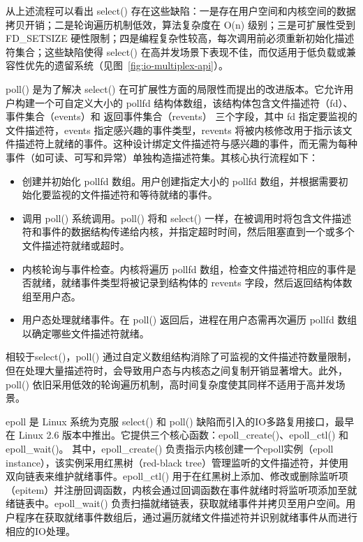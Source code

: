 {\begin{enumerate}[label=\arabic*.]
    从上述流程可以看出 select() 存在这些缺陷：一是存在用户空间和内核空间的数据拷贝开销；二是轮询遍历机制低效，算法复杂度在 O(n) 级别；三是可扩展性受到 FD\_SETSIZE 硬性限制；四是编程复杂性较高，每次调用前必须重新初始化描述符集合；这些缺陷使得 select() 在高并发场景下表现不佳，而仅适用于低负载或兼容性优先的遗留系统（见图~\ref{fig:io-multiplex-api}）。

    poll() 是为了解决 select() 在可扩展性方面的局限性而提出的改进版本。它允许用户构建一个可自定义大小的 pollfd 结构体数组，该结构体包含文件描述符（fd）、事件集合（events）和 返回事件集合（revents） 三个字段，其中 fd 指定要监视的文件描述符，events 指定感兴趣的事件类型，revents 将被内核修改用于指示该文件描述符上就绪的事件。这种设计绑定文件描述符与感兴趣的事件，而无需为每种事件（如可读、可写和异常）单独构造描述符集。其核心执行流程如下：
    \begin{itemize}
        \item 创建并初始化 pollfd 数组。用户创建指定大小的 pollfd 数组，并根据需要初始化要监视的文件描述符和等待就绪的事件。
        \item 调用 poll() 系统调用。poll() 将和 select() 一样，在被调用时将包含文件描述符和事件的数据结构传递给内核，并指定超时时间，然后阻塞直到一个或多个文件描述符就绪或超时。
        \item 内核轮询与事件检查。内核将遍历 pollfd 数组，检查文件描述符相应的事件是否就绪，就绪事件类型将被记录到结构体的 revents 字段，然后返回结构体数组至用户态。
        \item 用户态处理就绪事件。在 poll() 返回后，进程在用户态需再次遍历 pollfd 数组以确定哪些文件描述符就绪。
    \end{itemize}
    
    相较于select()，poll() 通过自定义数组结构消除了可监视的文件描述符数量限制，但在处理大量描述符时，会导致用户态与内核态之间复制开销显著增大。此外，poll() 依旧采用低效的轮询遍历机制，高时间复杂度使其同样不适用于高并发场景。
    
    epoll 是 Linux 系统为克服 select() 和 poll() 缺陷而引入的IO多路复用接口，最早在 Linux 2.6 版本中推出。它提供三个核心函数：epoll\_create()、epoll\_ctl() 和 epoll\_wait()。 其中，epoll\_create() 负责指示内核创建一个epoll实例（epoll instance），该实例采用红黑树（red-black tree）管理监听的文件描述符，并使用双向链表来维护就绪事件。epoll\_ctl() 用于在红黑树上添加、修改或删除监听项（epitem）并注册回调函数，内核会通过回调函数在事件就绪时将监听项添加至就绪链表中。epoll\_wait() 负责扫描就绪链表，获取就绪事件并拷贝至用户空间。用户程序在获取就绪事件数组后，通过遍历就绪文件描述符并识别就绪事件从而进行相应的IO处理。


\end{enumerate}}
